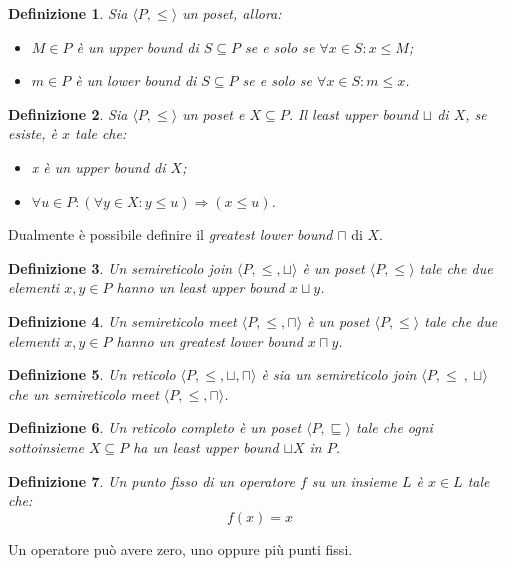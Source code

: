 \documentclass[a4paper, 10pt]{report}
\newtheorem{definit}{Definizione}
\begin{document}
\begin{definit}
	Sia $\langle P, \leq \rangle$ un poset, allora:
	\begin{itemize}
		\item $M \in P$ è un upper bound di $S \subseteq P$ se e solo se $\forall x \in S : x \leq M$;
		\item $m \in P$ è un lower bound di $S \subseteq P$ se e solo se $\forall x \in S : m \leq x$.
	\end{itemize}
\end{definit}

\begin{definit}
	Sia $\langle P, \leq \rangle$ un poset e $X \subseteq P$. Il least upper bound $\sqcup$ di $X$, se esiste, è $x$ tale che:
	\begin{itemize}
		\item x è un upper bound di $X$;
		\item $\forall u \in P : (\forall y \in X : y \leq u) \Rightarrow (x \leq u)$.
	\end{itemize}
\end{definit}
Dualmente è possibile definire il \textit{greatest lower bound} $\sqcap$ di $X$.

\begin{definit}
	Un semireticolo join $\langle P, \leq, \sqcup \rangle$ è un poset $\langle P , \leq \rangle$ tale che due elementi $x,y \in P$ hanno un least upper bound $ x \sqcup y$.
\end{definit}

\begin{definit}
	Un semireticolo meet $\langle P, \leq, \sqcap \rangle$ è un poset $\langle P , \leq \rangle$ tale che due elementi $x,y \in P$ hanno un greatest lower bound $x \sqcap y$.
\end{definit}

\begin{definit}
	Un reticolo $\langle P, \leq, \sqcup, \sqcap \rangle$ è sia un semireticolo join $\langle P, \leq~,~\sqcup \rangle$ che un semireticolo meet $\langle P, \leq,\sqcap \rangle$.
\end{definit}

\begin{definit}
	Un reticolo completo è un poset $\langle P, \sqsubseteq \rangle$ tale che ogni sottoinsieme $X \subseteq P$ ha un least upper bound $\sqcup X$ in $P$.
\end{definit}

\begin{definit}
	Un punto fisso di un operatore $f$ su un insieme $L$ è $x \in L$ tale che:
	$$
	f(x)=x
	$$
\end{definit}
Un operatore può avere zero, uno oppure più punti fissi.
\end{document}
